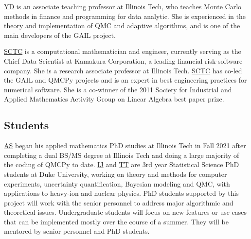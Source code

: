 \documentclass[11pt]{NSFamsart}
\newcommand{\SCTC}{\hyperlink{SCTClink}{SCTC}\xspace}
\newcommand{\IJi}{\hyperlink{IJlink}{IJ}\xspace}
\newcommand{\TT}{\hyperlink{TTlink}{TT}\xspace}
\newcommand{\YD}{\hyperlink{YDlink}{YD}\xspace}
\newcommand{\AS}{\hyperlink{ASlink}{AS}\xspace}
\begin{document}

\YD is an associate teaching professor at Illinois Tech, who teaches Monte Carlo methods in finance and programming for data analytic. She is experienced in the theory and implementation of QMC and adaptive algorithms, and is one of the main developers of the GAIL project.


\SCTC is a computational mathematician and engineer, currently serving as the Chief Data Scientist at Kamakura Corporation, a leading financial risk-software company.  She is a research associate professor at Illinois Tech.  \SCTC has co-led the GAIL and QMCPy projects and is an expert in best engineering practices for numerical software.  She is a co-winner of the 2011 Society for Industrial and Applied Mathematics Activity Group on Linear Algebra best paper prize.


\subsection{Students}  \AS began his applied mathematics PhD studies at Illinois Tech in Fall 2021 after completing a dual BS/MS degree at Illinois Tech and doing a large majority of the coding of QMCPy  to date. \IJi and \TT are 3rd year Statistical Science PhD students at Duke University, working on theory and methods for computer experiments, uncertainty quantification, Bayesian modeling and QMC, with applications to heavy-ion and nuclear physics.
PhD students supported by this project will work with the senior personnel to address major algorithmic and theoretical issues.  Undergraduate students will focus on new features or use cases that can be implemented mostly over the course of a summer.  They will be mentored by senior personnel and PhD students. 
\end{document}
